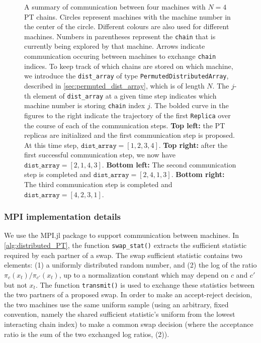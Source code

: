 \begin{figure}[t]
\begin{minipage}{0.48\textwidth}
  \end{minipage}
  \caption{
    A summary of communication between four machines with $N=4$ PT chains.
    Circles represent machines with the machine number in the center of the circle. 
    Different colours are also used for different machines.
    Numbers in parentheses represent the \texttt{chain} 
    that is currently being explored by that machine. 
    Arrows indicate communication occuring between machines to exchange \texttt{chain} 
    indices.
    To keep track of which chains are stored on which machine, we introduce the 
    \texttt{dist\_array} of type \texttt{PermutedDistributedArray}, described in 
    \cref{sec:permuted_dist_array}, which is of length $N$. 
    The $j$-th element of \texttt{dist\_array} at a given time step indicates which 
    machine number is storing \texttt{chain} index $j$.
    The bolded curve in the figures to the right indicate the trajectory of the first 
    \texttt{Replica} over the course of each of the communication steps.      
    \textbf{Top left:} the PT replicas are initialized and the first communication step 
    is proposed. At this time step, $\texttt{dist\_array} = [1,2,3,4]$.
    \textbf{Top right:} after the first successful communication step, we now have 
    $\texttt{dist\_array} = [2,1,4,3]$.
    \textbf{Bottom left:} The second communication step is completed and 
    $\texttt{dist\_array} = [2,4,1,3]$.
    \textbf{Bottom right:} The third communication step is completed and 
    $\texttt{dist\_array} = [4,2,3,1]$.}
  \label{fig:index_process}
\end{figure}

\subsubsection{MPI implementation details}
We use the MPI.jl \cite{byrne2021mpi} package to support communication between machines. 
In  \cref{alg:distributed_PT}, the function \texttt{swap\_stat()} extracts the 
sufficient statistic required by each partner of a swap. The swap
sufficient statistic contains two elements:
(1) a uniformly distributed random number, and (2) the log of the ratio 
$\pi_c(x_t) / \pi_{c'}(x_t)$, up to a normalization constant which may 
depend on $c$ and $c'$ but not $x_t$.  
The function \texttt{transmit()} is used to exchange these statistics 
between the two partners of a proposed swap. In order to make an 
accept-reject decision, the two machines use the same uniform sample (using an arbitrary, fixed 
convention, namely the shared sufficient statistic's uniform from the lowest 
interacting chain index) to make a common swap decision (where the 
acceptance ratio is the sum of the two exchanged log ratios, (2)). 

